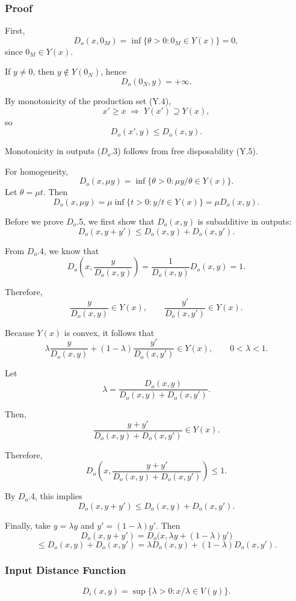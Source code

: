 \subsubsection*{Proof}

First,
\[
D_o(x,0_M)
=
\inf \{\theta > 0 : 0_M \in Y(x)\}
= 0,
\]
since $0_M \in Y(x)$.

If $y \ne 0$, then $y \notin Y(0_N)$, hence
\[
D_o(0_N,y) = +\infty.
\]

By monotonicity of the production set (Y.4),
\[
x' \ge x \;\Rightarrow\; Y(x') \supseteq Y(x),
\]
so
\[
D_o(x',y) \le D_o(x,y).
\]

Monotonicity in outputs ($D_o$.3) follows from free disposability (Y.5).

For homogeneity,
\[
D_o(x,\mu y)
=
\inf \{\theta > 0 : \mu y/\theta \in Y(x)\}.
\]
Let $\theta = \mu t$. Then
\[
D_o(x,\mu y)
=
\mu \inf \{t > 0 : y/t \in Y(x)\}
=
\mu D_o(x,y).
\]

Before we prove $D_o$.5, we first show that $D_o(x,y)$ is subadditive in outputs:
\[
D_o(x,y+y') \le D_o(x,y) + D_o(x,y').
\]

From $D_o$.4, we know that
\[
D_o\left(x,\frac{y}{D_o(x,y)}\right)
=
\frac{1}{D_o(x,y)} D_o(x,y)
=1.
\]

Therefore,
\[
\frac{y}{D_o(x,y)} \in Y(x),
\qquad
\frac{y'}{D_o(x,y')} \in Y(x).
\]

Because $Y(x)$ is convex, it follows that
\[
\lambda \frac{y}{D_o(x,y)}
+
(1-\lambda)\frac{y'}{D_o(x,y')}
\in Y(x),
\qquad 0 < \lambda < 1.
\]

Let
\[
\lambda = \frac{D_o(x,y)}{D_o(x,y)+D_o(x,y')}.
\]

Then,
\[
\frac{y+y'}{D_o(x,y)+D_o(x,y')} \in Y(x).
\]

Therefore,
\[
D_o\left(x,\frac{y+y'}{D_o(x,y)+D_o(x,y')}\right) \le 1.
\]

By $D_o$.4, this implies
\[
D_o(x,y+y') \le D_o(x,y) + D_o(x,y').
\]

Finally, take $y=\lambda y$ and $y'=(1-\lambda)y'$. Then
\[
D_o(x,y+y')
=
D_o\bigl(x,\lambda y + (1-\lambda)y'\bigr)
\]
\[
\le
D_o(x,y) + D_o(x,y')
=
\lambda D_o(x,y) + (1-\lambda)D_o(x,y').
\]




\subsubsection{Input Distance Function}

\[
D_i(x,y)
=
\sup \{\lambda > 0 : x/\lambda \in V(y)\}.
\]

